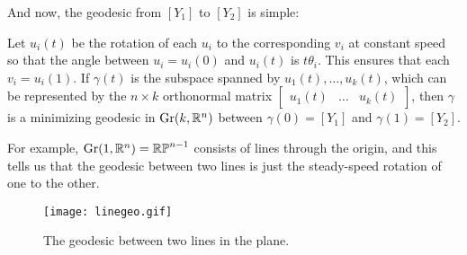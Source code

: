 And now, the geodesic from $[Y_1]$ to $[Y_2]$ is simple: 

\begin{theorem}\label{thm:grassmannian geodesics}
	Let $u_i(t)$ be the rotation of each $u_i$ to the corresponding $v_i$ at constant speed so that the angle between $u_i = u_i(0)$ and $u_i(t)$ is $t \theta_i$. This ensures that each $v_i = u_i(1)$. If $\gamma(t)$ is the subspace spanned by $u_1(t), \dots , u_k(t)$, which can be represented by the $n \times k$ orthonormal matrix $\begin{bmatrix} u_1(t) & \dots & u_k(t)\end{bmatrix}$, then $\gamma$ is a minimizing geodesic in $\operatorname{Gr}(k,\mathbb{R}^n)$ between $\gamma(0) = [Y_1]$ and $\gamma(1) = [Y_2]$.
\end{theorem} 

 
For example, $\operatorname{Gr}(1,\mathbb{R}^n) = \mathbb{RP}^{n-1}$ consists of lines through the origin, and this tells us that the geodesic between two lines is just the steady-speed rotation of one to the other.

	\ifplastex
	\begin{figure}[htbp]
		\centering
			\texttt{[image: linegeo.gif]}
		\caption{The geodesic between two lines in the plane.}
		\label{fig:line geodesics}
	\end{figure}
	\fi

